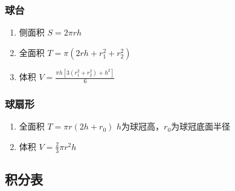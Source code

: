 \documentclass[landscape,twocolumn,a4paper]{article}
\begin{document}
	\subsubsection{球台}
	
	\begin{enumerate}
		\item 侧面积
		$S=2\pi rh$
		\item 全面积
		$T=\pi(2rh+r_1^2+r_2^2)$
		\item 体积
		$V=\frac{\pi h[3(r_1^2+r_2^2)+h^2]}{6}$
	\end{enumerate}
	
	\subsubsection{球扇形}
	
	\begin{enumerate}
		\item 全面积
		$T=\pi r(2h+r_0)$
		$h$为球冠高，$r_0$为球冠底面半径
		\item 体积
		$V=\frac{2}{3}\pi r^2h$
	\end{enumerate}
	
	\subsection{积分表}
	
\end{document}
